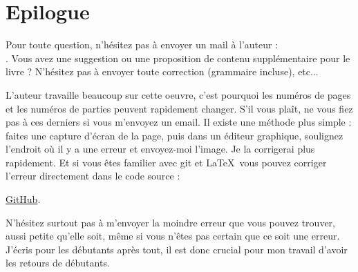 ﻿\part*{Epilogue}


Pour toute question, n'hésitez pas à envoyer un mail à l'auteur : \\
\GTT{<\EMAIL>}.
Vous avez une suggestion ou une proposition de contenu supplémentaire pour le livre ?
N'hésitez pas à envoyer toute correction (grammaire incluse), etc...

L'auteur travaille beaucoup sur cette oeuvre, c'est pourquoi les numéros de pages et les numéros de parties peuvent rapidement changer.
S'il vous plaît, ne vous fiez pas à ces derniers si vous m'envoyez un email. 
Il existe une méthode plus simple : faites une capture d'écran de la page, puis dans un éditeur graphique, soulignez l'endroit où il y a une erreur et envoyez-moi l'image. Je la corrigerai plus rapidement.
Et si vous êtes familier avec git et \LaTeX\, vous pouvez corriger l'erreur directement dans le code source :

\href{http://go.yurichev.com/17089}{GitHub}.

N'hésitez surtout pas à m'envoyer la moindre erreur que vous pouvez trouver, aussi petite qu'elle soit, même si vous n'êtes pas certain que ce soit une erreur.
J'écris pour les débutants après tout, il est donc crucial pour mon travail d'avoir les retours de débutants.

